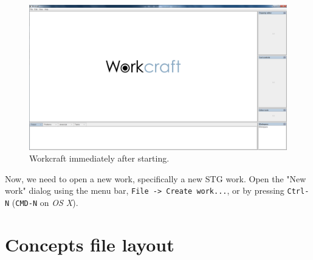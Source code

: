 \documentclass{proc}
\begin{document}
\begin{figure}[h]
\begin{centering}
\includegraphics[scale=0.2]{images/blank_workcraft_screenshot}
\par\end{centering}

\begin{centering}
\protect\caption{\label{fig:blank_workcraft_screen}Workcraft immediately after starting.}

\par\end{centering}

\end{figure}

Now, we need to open a new work, specifically a new STG work. Open the "New work" dialog using the menu bar, \texttt{File -> Create work...}, or by pressing \texttt{Ctrl-N} (\texttt{CMD-N} on \emph{OS X}).

\section{Concepts file layout \label{sec:concepts_layout}}


\newpage


\end{document}
